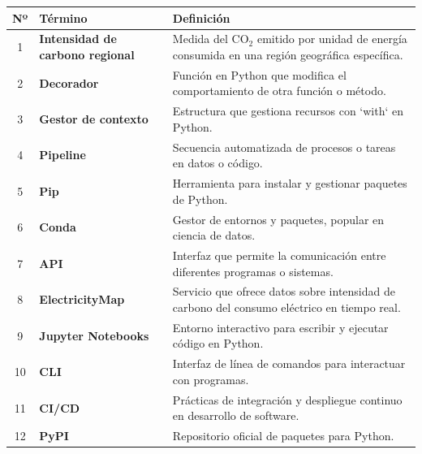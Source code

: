 \documentclass[12pt,a4paper]{report}
\begin{document}
\begin{table}[h]
\centering
\begin{tabular}{@{}cll@{}}
\toprule
\textbf{Nº} & \textbf{Término} & \textbf{Definición} \\
\midrule
1 & \textbf{Intensidad de carbono regional} & Medida del CO$_2$ emitido por unidad de energía consumida en una región geográfica específica. \\
2 & \textbf{Decorador} & Función en Python que modifica el comportamiento de otra función o método. \\
3 & \textbf{Gestor de contexto} & Estructura que gestiona recursos con `with` en Python. \\
4 & \textbf{Pipeline} & Secuencia automatizada de procesos o tareas en datos o código. \\
5 & \textbf{Pip} & Herramienta para instalar y gestionar paquetes de Python. \\
6 & \textbf{Conda} & Gestor de entornos y paquetes, popular en ciencia de datos. \\
7 & \textbf{API} & Interfaz que permite la comunicación entre diferentes programas o sistemas. \\
8 & \textbf{ElectricityMap} & Servicio que ofrece datos sobre intensidad de carbono del consumo eléctrico en tiempo real. \\
9 & \textbf{Jupyter Notebooks} & Entorno interactivo para escribir y ejecutar código en Python. \\
10 & \textbf{CLI} & Interfaz de línea de comandos para interactuar con programas. \\
11 & \textbf{CI/CD} & Prácticas de integración y despliegue continuo en desarrollo de software. \\
12 & \textbf{PyPI} & Repositorio oficial de paquetes para Python. \\
\bottomrule
\end{tabular}
\end{table}
\end{document}
